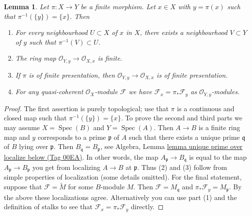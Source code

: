 \documentclass{amsart}
\theoremstyle{plain}
\newtheorem{lemma}[subsection]{Lemma}
\theoremstyle{definition}
\theoremstyle{remark}
\numberwithin{equation}{subsection}
\def\Spec{\mathop{\mathrm{Spec}}}
\begin{document}
\begin{lemma}
\label{more-morphisms-lemma-finite-morphism-single-point-in-fibre}
Let $\pi : X \to Y$ be a finite morphism.
Let $x \in X$ with $y = \pi(x)$ such that $\pi^{-1}(\{y\}) = \{x\}$.
Then
\begin{enumerate}
\item For every neighbourhood $U \subset X$ of $x$ in $X$, there
exists a neighbourhood $V \subset Y$ of $y$ such that
$\pi^{-1}(V) \subset U$.
\item The ring map $\mathcal{O}_{Y, y} \to \mathcal{O}_{X, x}$
is finite.
\item If $\pi$ is of finite presentation, then
$\mathcal{O}_{Y, y} \to \mathcal{O}_{X, x}$ is of finite presentation.
\item For any quasi-coherent $\mathcal{O}_X$-module $\mathcal{F}$
we have $\mathcal{F}_x = \pi_*\mathcal{F}_y$ as
$\mathcal{O}_{Y, y}$-modules.
\end{enumerate}
\end{lemma}

\begin{proof}
The first assertion is purely topological; use that
$\pi$ is a continuous and closed map such that $\pi^{-1}(\{y\}) = \{x\}$.
To prove the second and third parts we may assume
$X = \Spec(B)$ and $Y = \Spec(A)$. Then
$A \to B$ is a finite ring map and $y$ corresponds to a prime
$\mathfrak p$ of $A$ such that there exists a unique prime $\mathfrak q$ of
$B$ lying over $\mathfrak p$. Then
$B_{\mathfrak q} = B_{\mathfrak p}$, see
Algebra, Lemma \href{https://stacks.math.columbia.edu/tag/00EA}{lemma unique prime over localize below (Tag 00EA)}.
In other words, the map $A_{\mathfrak p} \to B_{\mathfrak q}$
is equal to the map $A_{\mathfrak p} \to B_{\mathfrak p}$ you get
from localizing $A \to B$ at $\mathfrak p$.
Thus (2) and (3) follow from simple properties of localization
(some details omitted). For the final statement, suppose that
$\mathcal{F} = \widetilde M$ for some $B$-module $M$.
Then $\mathcal{F} = M_{\mathfrak q}$ and
$\pi_*\mathcal{F}_y = M_{\mathfrak p}$. By the above these
localizations agree. Alternatively you can use part (1) and
the definition of stalks to see that $\mathcal{F}_x = \pi_*\mathcal{F}_y$
directly.
\end{proof}
\end{document}
